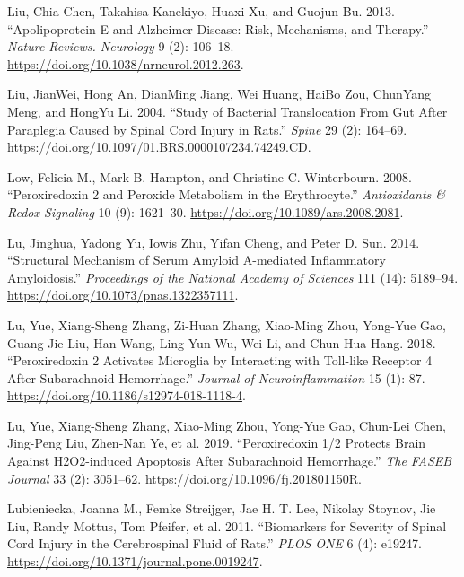 \documentclass[9pt,lineno]{elife}
\newlength{\cslhangindent}
\newlength{\cslentryspacingunit} %
\newenvironment{CSLReferences}[2] %
 {%
  \setlength{\parindent}{0pt}
  \ifodd #1
  \let\oldpar\par
  \def\par{\hangindent=\cslhangindent\oldpar}
  \fi
  \setlength{\parskip}{#2\cslentryspacingunit}
 }%
 {}
\begin{document}
\begin{CSLReferences}{1}{0}
\leavevmode{}%
Liu, Chia-Chen, Takahisa Kanekiyo, Huaxi Xu, and Guojun Bu. 2013. {``Apolipoprotein {E} and {Alzheimer} Disease: Risk, Mechanisms, and Therapy.''} \emph{Nature Reviews. Neurology} 9 (2): 106--18. \url{https://doi.org/10.1038/nrneurol.2012.263}.

\leavevmode{}%
Liu, JianWei, Hong An, DianMing Jiang, Wei Huang, HaiBo Zou, ChunYang Meng, and HongYu Li. 2004. {``Study of {Bacterial Translocation From Gut After Paraplegia Caused} by {Spinal} Cord {Injury} in {Rats}.''} \emph{Spine} 29 (2): 164--69. \url{https://doi.org/10.1097/01.BRS.0000107234.74249.CD}.

\leavevmode{}%
Low, Felicia M., Mark B. Hampton, and Christine C. Winterbourn. 2008. {``Peroxiredoxin 2 and {Peroxide Metabolism} in the {Erythrocyte}.''} \emph{Antioxidants \& Redox Signaling} 10 (9): 1621--30. \url{https://doi.org/10.1089/ars.2008.2081}.

\leavevmode{}%
Lu, Jinghua, Yadong Yu, Iowis Zhu, Yifan Cheng, and Peter D. Sun. 2014. {``Structural Mechanism of Serum Amyloid {A-mediated} Inflammatory Amyloidosis.''} \emph{Proceedings of the National Academy of Sciences} 111 (14): 5189--94. \url{https://doi.org/10.1073/pnas.1322357111}.

\leavevmode{}%
Lu, Yue, Xiang-Sheng Zhang, Zi-Huan Zhang, Xiao-Ming Zhou, Yong-Yue Gao, Guang-Jie Liu, Han Wang, Ling-Yun Wu, Wei Li, and Chun-Hua Hang. 2018. {``Peroxiredoxin 2 Activates Microglia by Interacting with {Toll-like} Receptor 4 After Subarachnoid Hemorrhage.''} \emph{Journal of Neuroinflammation} 15 (1): 87. \url{https://doi.org/10.1186/s12974-018-1118-4}.

\leavevmode{}%
Lu, Yue, Xiang-Sheng Zhang, Xiao-Ming Zhou, Yong-Yue Gao, Chun-Lei Chen, Jing-Peng Liu, Zhen-Nan Ye, et al. 2019. {``Peroxiredoxin 1/2 Protects Brain Against {H2O2-induced} Apoptosis After Subarachnoid Hemorrhage.''} \emph{The FASEB Journal} 33 (2): 3051--62. \url{https://doi.org/10.1096/fj.201801150R}.

\leavevmode{}%
Lubieniecka, Joanna M., Femke Streijger, Jae H. T. Lee, Nikolay Stoynov, Jie Liu, Randy Mottus, Tom Pfeifer, et al. 2011. {``Biomarkers for {Severity} of {Spinal Cord Injury} in the {Cerebrospinal Fluid} of {Rats}.''} \emph{PLOS ONE} 6 (4): e19247. \url{https://doi.org/10.1371/journal.pone.0019247}.


\end{CSLReferences}
\end{document}
